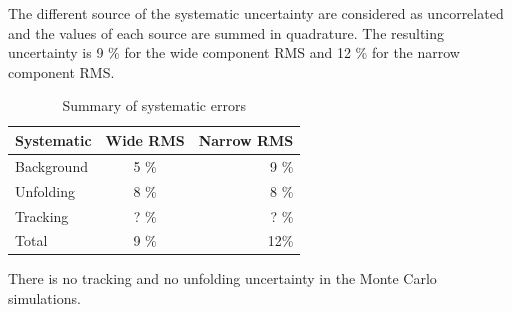 The different source of the systematic uncertainty are considered as uncorrelated and the values of each source are summed in quadrature. The resulting uncertainty is 9 \% for the wide component RMS and 12 \% for the narrow component RMS. 

\begin{table}[htb]
\centering
\caption{Summary of systematic errors}
\label{tab:systematics}
\begin{tabular}{ l | c | r }
  Systematic & Wide RMS & Narrow RMS \\
    \hline			
  Background & 5 \% & 9 \% \\
  Unfolding & 8 \% & 8 \% \\
  Tracking & ? \% & ? \% \\
  Total & 9 \% & 12\% \\
  \hline
  \end{tabular}
  \end{table}

There is no tracking and no unfolding uncertainty in the Monte Carlo simulations. 